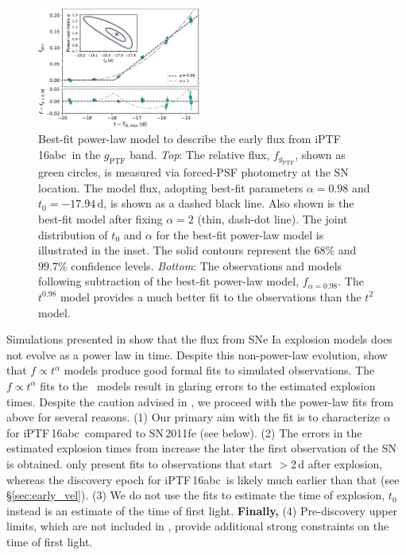\documentclass[twocolumn]{aastex61}
\newcommand{\abc}{iPTF\,16abc}
\begin{document}
\begin{figure}[!htb]
  \centering
  \includegraphics[width=0.48\textwidth]{early_lc.pdf}
  \caption{Best-fit power-law model to describe the early flux 
  from \abc\ in the $g_\mathrm{PTF}$ band. \textit{Top}: The 
  relative flux, 
  $f_{g_\mathrm{PTF}}$, shown as green circles, is measured via 
  forced-PSF photometry at the SN location. The model flux, 
  adopting best-fit parameters $\alpha=0.98$ and 
  $t_0=-17.94\,\textrm{d}$, is shown as a dashed black line. Also 
  shown is the best-fit model after fixing 
  $\alpha=2$ (thin, dash-dot line). 
  The joint distribution of $t_0$ and $\alpha$ for the best-fit 
  power-law model is illustrated in the inset. 
  The solid contours represent the $68\%$ and $99.7\%$ confidence 
  levels.
  \textit{Bottom}: 
  The observations and models following 
  subtraction of the best-fit power-law model, $f_{\alpha = 0.98}$.
  The $t^{0.98}$ model provides a much better fit to the 
  observations than the $t^2$ model. 
  }
  \label{fig:early_lc_fit}
\end{figure}

Simulations presented in \citet{2017arXiv170603613N} show that the flux from
SNe Ia explosion models does not evolve as a power law in time. Despite this
non-power-law evolution, \citet{2017arXiv170603613N} show that $f \propto
t^\alpha$ models produce good formal fits to simulated observations. The $f
\propto t^\alpha$ fits to the \citeauthor{2017arXiv170603613N}\ models result
in glaring errors to the estimated explosion times. Despite the caution
advised in \citet{2017arXiv170603613N}, we proceed with the power-law fits
from above for several reasons. (1) Our primary aim with the fit is to
characterize $\alpha$ for \abc\ compared to SN\,2011fe (see below). (2) The
errors in the estimated explosion times from \citeauthor{2017arXiv170603613N}
increase the later the first observation of the SN is obtained.
\citeauthor{2017arXiv170603613N} only present fits to observations that start
$>$2\,d after explosion, whereas the discovery epoch for \abc\ is likely much
earlier than that (see \S\ref{sec:early_vel}). (3) We do not use the fits to
estimate the time of explosion, $t_0$ instead is an estimate of the time of
first light. \textbf{Finally,} (4) Pre-discovery upper limits, which are not
included in \citeauthor{2017arXiv170603613N}, provide additional strong
constraints on the time of first light.
\end{document}
